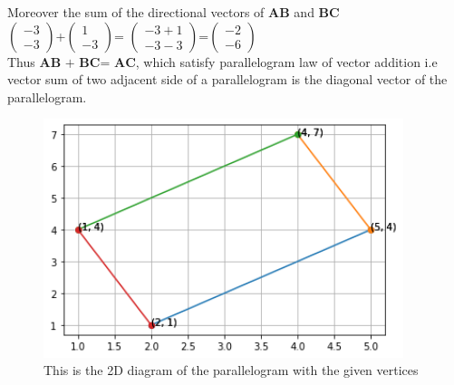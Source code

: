 \documentclass[journal,12pt,twocolumn]{IEEEtran}
\newcommand{\myvec}[1]{\ensuremath{\begin{pmatrix}#1\end{pmatrix}}}
\numberwithin{equation}{subsection}
\let\vec\mathbf
\begin{document}
Moreover the sum of the directional vectors of $\vec{AB}$ and $\vec{BC}$ \\
  
\myvec{-3\\-3}+\myvec{1 \\-3}= \myvec{-3+1 \\-3-3}=\myvec{-2 \\-6}\\

Thus $\vec{AB}$ $+$ $\vec{BC}$= $\vec{AC}$, which satisfy
parallelogram law of vector addition i.e vector
sum of two adjacent side of a parallelogram is the
diagonal vector of the parallelogram.
\begin{figure}[!]
 \begin{center}
  \includegraphics[width=10.5cm]{assignment2_ fig.png}
    \caption{This is the 2D diagram of the parallelogram with the given vertices}
    \label{myfig:1}
    \end{center}
\end{figure}
\end{document}
